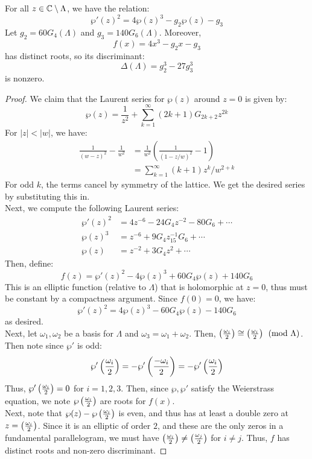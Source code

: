 \documentclass[12pt]{article}
\begin{document}
\begin{theorem}
    For all $z \in \mathbb C \setminus \Lambda$, we have the relation: 
    \[ \wp'(z)^2 = 4\wp(z)^3 - g_2\wp(z) - g_3\]
    Let $g_2 = 60G_4(\Lambda)$ and $g_3 = 140G_6(\Lambda)$. Moreover,
    \[ f(x) = 4x^3 - g_2x - g_3\]
    has distinct roots, so its discriminant:
    \[ \Delta(\Lambda) = g_2^3 - 27g_3^3\]
    is nonzero. 
\end{theorem}
\begin{proof}
    We claim that the Laurent series for $\wp(z)$ around $z = 0$ is given by: 
    \[ \wp(z) = \frac{1}{z^2} + \sum_{k=1}^\infty (2k+1)G_{2k+2}z^{2k} \]
    For $|z| < |w|$, we have:
    \begin{align*}
        \frac{1}{(w-z)^2} - \frac{1}{w^2} &= \frac{1}{w^2}\left(\frac{1}{(1-z/w)^2} - 1\right) \\
        &= \sum_{k=1}^\infty (k+1)z^k/w^{2+k}
    \end{align*}
    For odd $k$, the terms cancel by symmetry of the lattice. We get the desired series by substituting this in.  \\
    Next, we compute the following Laurent series:
    \begin{align*}
        \wp'(z)^2 &= 4z^{-6} -24G_4z^{-2} -80G_6 + \cdots \\
        \wp(z)^3 &= z^{-6} + 9G_4z^{-1} _ 15G_6 + \cdots \\
        \wp(z) &= z^{-2} + 3G_4z^2 + \cdots 
    \end{align*}
    Then, define: 
    \[ f(z) = \wp'(z)^2-4\wp(z)^3+60G_4\wp(z)+140G_6\]
    This is an elliptic function (relative to $\Lambda$) that is holomorphic at $z = 0$, thus must be constant by a compactness argument. Since $f(0) = 0$, we have:
    \[\wp'(z)^2 = 4\wp(z)^3-60G_4\wp(z)-140G_6 \]
    as desired. \\
    Next, let $\omega_1, \omega_2$ be a basis for $\Lambda$ and $\omega_3 = \omega_1 + \omega_2$. Then, $\left(\frac{\omega_i}{2}\right) \cong \left(\frac{\omega_i}{2}\right) \pmod{\Lambda}$. Then note since $\wp'$ is odd:
    \[ \wp'\left(\frac{\omega_i}{2}\right) = -\wp'\left(\frac{-\omega_i}{2}\right) = -\wp'\left(\frac{\omega_i}{2}\right) \]
    Thus, $\wp'\left(\frac{\omega_i}{2}\right) = 0$ for $i = 1,2,3$. Then, since $\wp, \wp'$ satisfy the Weierstrass equation, we note $\wp\left(\frac{\omega_i}{2}\right)$ are roots for $f(x)$. \\
    Next, note that $\wp(z) - \wp\left(\frac{\omega_i}{2}\right)$ is even, and thus has at least a double zero at $z = \left(\frac{\omega_i}{2}\right)$. Since it is an elliptic of order $2$, and these are the only zeros in a fundamental parallelogram, we must have $\left(\frac{\omega_i}{2}\right) \neq \left(\frac{\omega_j}{2}\right)$ for $i \neq j$. Thus, $f$ has distinct roots and non-zero discriminant.
\end{proof}
\end{document}
